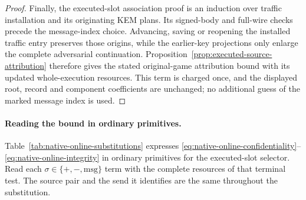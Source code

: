 \begin{proof}
Finally, the executed-slot association proof is an induction over
traffic installation and its originating KEM plans. Its signed-body
and full-wire checks precede the message-index choice. Advancing,
saving or reopening the installed traffic entry preserves those
origins, while the earlier-key projections only enlarge the complete
adversarial continuation. Proposition~\ref{prop:executed-source-attribution}
therefore gives the stated original-game attribution bound with
its updated whole-execution resources. This term is charged once,
and the displayed root, record and component coefficients are unchanged;
no additional guess of the marked message index is used.
\end{proof}

\paragraph{Reading the bound in ordinary primitives.}
Table~\ref{tab:native-online-substitutions} expresses
\eqref{eq:native-online-confidentiality}--\eqref{eq:native-online-integrity}
in ordinary primitives for the executed-slot selector. Read each
$\sigma\in\{+,-,\mathrm{msg}\}$ term with the complete resources of
that terminal test. The source pair and the send it identifies are the
same throughout the substitution.

